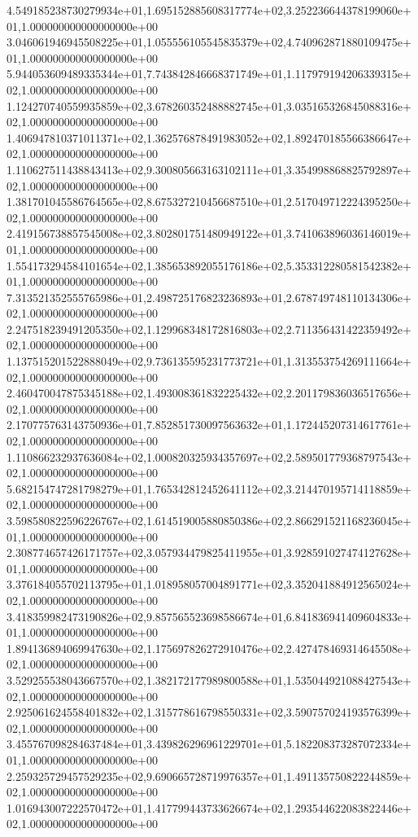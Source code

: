 4.549185238730279934e+01,1.695152885608317774e+02,3.252236644378199060e+01,1.000000000000000000e+00
3.046061946945508225e+01,1.055556105545835379e+02,4.740962871880109475e+01,1.000000000000000000e+00
5.944053609489335344e+01,7.743842846668371749e+01,1.117979194206339315e+02,1.000000000000000000e+00
1.124270740559935859e+02,3.678260352488882745e+01,3.035165326845088316e+02,1.000000000000000000e+00
1.406947810371011371e+02,1.362576878491983052e+02,1.892470185566386647e+02,1.000000000000000000e+00
1.110627511438843413e+02,9.300805663163102111e+01,3.354998868825792897e+02,1.000000000000000000e+00
1.381701045586764565e+02,8.675327210456687510e+01,2.517049712224395250e+02,1.000000000000000000e+00
2.419156738857545008e+02,3.802801751480949122e+01,3.741063896036146019e+01,1.000000000000000000e+00
1.554173294584101654e+02,1.385653892055176186e+02,5.353312280581542382e+01,1.000000000000000000e+00
7.313521352555765986e+01,2.498725176823236893e+01,2.678749748110134306e+02,1.000000000000000000e+00
2.247518239491205350e+02,1.129968348172816803e+02,2.711356431422359492e+02,1.000000000000000000e+00
1.137515201522888049e+02,9.736135595231773721e+01,1.313553754269111664e+02,1.000000000000000000e+00
2.460470047875345188e+02,1.493008361832225432e+02,2.201179836036517656e+02,1.000000000000000000e+00
2.170775763143750936e+01,7.852851730097563632e+01,1.172445207314617761e+02,1.000000000000000000e+00
1.110866232937636084e+02,1.000820325934357697e+02,2.589501779368797543e+02,1.000000000000000000e+00
5.682154747281798279e+01,1.765342812452641112e+02,3.214470195714118859e+02,1.000000000000000000e+00
3.598580822596226767e+02,1.614519005880850386e+02,2.866291521168236045e+01,1.000000000000000000e+00
2.308774657426171757e+02,3.057934479825411955e+01,3.928591027474127628e+01,1.000000000000000000e+00
3.376184055702113795e+01,1.018958057004891771e+02,3.352041884912565024e+02,1.000000000000000000e+00
3.418359982473190826e+02,9.857565523698586674e+01,6.841836941409604833e+01,1.000000000000000000e+00
1.894136894069947630e+02,1.175697826272910476e+02,2.427478469314645508e+02,1.000000000000000000e+00
3.529255538043667570e+02,1.382172177989800588e+01,1.535044921088427543e+02,1.000000000000000000e+00
2.925061624558401832e+02,1.315778616798550331e+02,3.590757024193576399e+02,1.000000000000000000e+00
3.455767098284637484e+01,3.439826296961229701e+01,5.182208373287072334e+01,1.000000000000000000e+00
2.259325729457529235e+02,9.690665728719976357e+01,1.491135750822244859e+02,1.000000000000000000e+00
1.016943007222570472e+01,1.417799443733626674e+02,1.293544622083822446e+02,1.000000000000000000e+00
